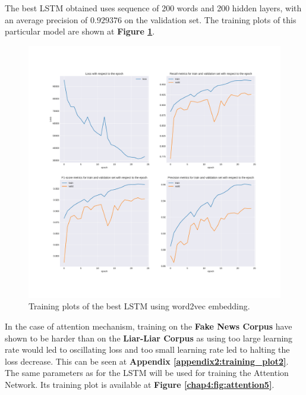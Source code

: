 The best LSTM obtained uses sequence of 200 words and 200 hidden layers, with an average precision of $0.929376$ on the validation set. The training plots of this particular model are shown at \textbf{Figure \ref{chap4:fig:lstm5.1}}.\\
\begin{figure}
	\centering
	\includegraphics[width=\textwidth]{images/chapitre4/lstm5}
	\caption{Training plots of the best LSTM using word2vec embedding.}
	\label{chap4:fig:lstm5.1}
\end{figure} 



In the case of attention mechanism, training on the \textbf{Fake News Corpus} have shown to be harder than on the \textbf{Liar-Liar Corpus} as using too large learning rate would led to oscillating loss and too small learning rate led to halting the loss decrease. This can be seen at \textbf{Appendix \ref{appendix2:training_plot2}}. \\

The same parameters as for the LSTM will be used for training the Attention Network. Its training plot is available at \textbf{Figure \ref{chap4:fig:attention5}}.

